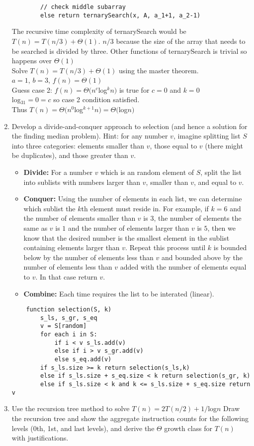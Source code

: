 \documentclass{article}
\begin{document}
\begin{enumerate}
\begin{lstlisting}
        // check middle subarray
        else return ternarySearch(x, A, a_1+1, a_2-1)
            \end{lstlisting}
            The recursive time complexity of ternarySearch would be $T(n)=T(n/3)+\Theta(1)$. $n/3$ because the size of the array that needs to be searched is divided by three. Other functions of ternarySearch is trivial so happens over $\Theta(1)$\\
            Solve $T(n)=T(n/3)+\Theta(1)$ using the master theorem.\\
            $a = 1$, $b = 3$, $f(n) = \Theta(1)$\\
            Guess case 2: $f(n)=\Theta(n^c$log$^kn)$ is true for $c=0$ and $k=0$\\
            log$_31 =0= c$ so case 2 condition satisfied.\\
            Thus $T(n)=\Theta(n^0$log$^{k+1}n) = \Theta($log$n)$
        \item Develop a divide-and-conquer approach to selection (and hence a solution for the finding median problem). Hint: for any number $v$, imagine splitting list $S$ into three categories: elements smaller than $v$, those equal to $v$ (there might be duplicates), and those greater than $v$. 
            \begin{itemize}
                \item \textbf{Divide:} For a number $v$ which is an random element of $S$, split the list into sublists with numbers larger than $v$, smaller than $v$, and equal to $v$.
                \item \textbf{Conquer:} Using the number of elements in each list, we can determine which sublist the $k$th element must reside in. For example, if $k=6$ and the number of elements smaller than $v$ is $3$, the number of elements the same as $v$ is $1$ and the number of elements larger than $v$ is $5$, then we know that the desired number is the smallest element in the sublist containing elements larger than $v$. Repeat this process until $k$ is bounded below by the number of elements less than $v$ and bounded above by the number of elements less than $v$ added with the number of elements equal to $v$. In that case return $v$.
                \item \textbf{Combine:} Each time requires the list to be interated (linear).
            \end{itemize}
            \begin{lstlisting}
    function selection(S, k)
        s_ls, s_gr, s_eq
        v = S[random]
        for each i in S:
            if i < v s_ls.add(v)
            else if i > v s_gr.add(v)
            else s_eq.add(v)
        if s_ls.size >= k return selection(s_ls,k)
        else if s_ls.size + s_eq.size < k return selection(s_gr, k)
        else if s_ls.size < k and k <= s_ls.size + s_eq.size return v
            \end{lstlisting}
        \item Use the recursion tree method to solve $T(n) = 2T(n/2)+1/$log$n$ Draw the recursion tree and show the aggregate instruction counts for the following levels (0th, 1st, and last levels), and derive the $\Theta$ growth class for $T(n)$ with justifications.
    \end{enumerate}
\end{document}
